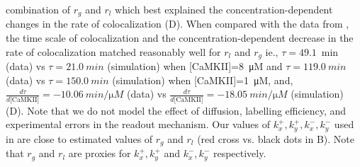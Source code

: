 \documentclass[9pt,lineno,doublespacing]{elife}
\begin{document}
combination of $r_g$ and $r_l$ which best explained the concentration-dependent
changes in the rate of colocalization (D). When
compared with the data from \cite{stratton_activation-triggered_2014}, the time
scale of colocalization and the concentration-dependent decrease in the rate of
colocalization matched reasonably well for $r_l$ and $r_g$ ie.,
$\tau=\SI{49.1}{\min}$ (data) vs $\tau=\SI{21.0}{min}$ (simulation) when
[CaMKII]=\SI{8}{\micro M} and $\tau=\SI{119.0}{min}$ (data) vs
$\tau=\SI{150.0}{min}$ (simulation) when [CaMKII]=\SI{1}{\micro M}, and,
$\frac{d\tau}{d\text{[CaMKII]}}=\SI{-10.06}{min\per\micro M}$ (data) vs
$\frac{d\tau}{d\text{[CaMKII]}}=\SI{-18.05}{min\per\micro M}$ (simulation)
(D). Note that we do not model the effect of
diffusion, labelling efficiency, and experimental errors in the readout 
mechanism.
Our values of $k_x^+, k_y^+, k_x^-, k_y^-$ used in  are close to
estimated values of $r_g$ and $r_l$ (red cross vs. black dots in
B). Note that $r_g$ and $r_l$ are proxies for
$k_x^+,k_y^+$ and $k_x^-, k_y^-$ respectively.
\end{document}
